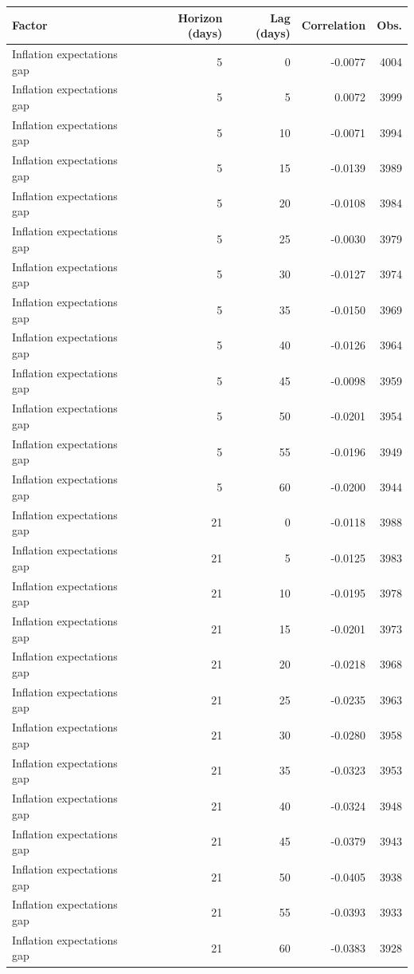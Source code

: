 \begin{tabular}{lrrrr}
\toprule
Factor & Horizon (days) & Lag (days) & Correlation & Obs. \\
\midrule
Inflation expectations gap & 5 & 0 & -0.0077 & 4004 \\
Inflation expectations gap & 5 & 5 & 0.0072 & 3999 \\
Inflation expectations gap & 5 & 10 & -0.0071 & 3994 \\
Inflation expectations gap & 5 & 15 & -0.0139 & 3989 \\
Inflation expectations gap & 5 & 20 & -0.0108 & 3984 \\
Inflation expectations gap & 5 & 25 & -0.0030 & 3979 \\
Inflation expectations gap & 5 & 30 & -0.0127 & 3974 \\
Inflation expectations gap & 5 & 35 & -0.0150 & 3969 \\
Inflation expectations gap & 5 & 40 & -0.0126 & 3964 \\
Inflation expectations gap & 5 & 45 & -0.0098 & 3959 \\
Inflation expectations gap & 5 & 50 & -0.0201 & 3954 \\
Inflation expectations gap & 5 & 55 & -0.0196 & 3949 \\
Inflation expectations gap & 5 & 60 & -0.0200 & 3944 \\
Inflation expectations gap & 21 & 0 & -0.0118 & 3988 \\
Inflation expectations gap & 21 & 5 & -0.0125 & 3983 \\
Inflation expectations gap & 21 & 10 & -0.0195 & 3978 \\
Inflation expectations gap & 21 & 15 & -0.0201 & 3973 \\
Inflation expectations gap & 21 & 20 & -0.0218 & 3968 \\
Inflation expectations gap & 21 & 25 & -0.0235 & 3963 \\
Inflation expectations gap & 21 & 30 & -0.0280 & 3958 \\
Inflation expectations gap & 21 & 35 & -0.0323 & 3953 \\
Inflation expectations gap & 21 & 40 & -0.0324 & 3948 \\
Inflation expectations gap & 21 & 45 & -0.0379 & 3943 \\
Inflation expectations gap & 21 & 50 & -0.0405 & 3938 \\
Inflation expectations gap & 21 & 55 & -0.0393 & 3933 \\
Inflation expectations gap & 21 & 60 & -0.0383 & 3928 \\

\end{tabular}
